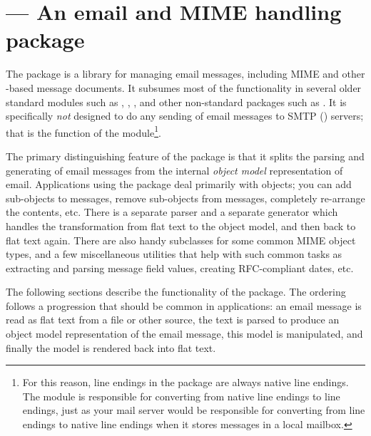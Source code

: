 
\section{ ---
	 An email and MIME handling package}



The  package is a library for managing email messages,
including MIME and other -based message documents.  It
subsumes most of the functionality in several older standard modules
such as , ,
, and other non-standard packages such as
.  It is specifically \emph{not} designed to do any
sending of email messages to SMTP () servers; that is the
function of the  module\footnote{For this reason,
line endings in the  package are always native line
endings.  The  module is responsible for converting
from native line endings to  line endings, just as your mail
server would be responsible for converting from  line
endings to native line endings when it stores messages in a local
mailbox.}.

The primary distinguishing feature of the  package is
that it splits the parsing and generating of email messages from the
internal \emph{object model} representation of email.  Applications
using the  package deal primarily with objects; you can
add sub-objects to messages, remove sub-objects from messages,
completely re-arrange the contents, etc.  There is a separate parser
and a separate generator which handles the transformation from flat
text to the object model, and then back to flat text again.  There
are also handy subclasses for some common MIME object types, and a few
miscellaneous utilities that help with such common tasks as extracting
and parsing message field values, creating RFC-compliant dates, etc.

The following sections describe the functionality of the
 package.  The ordering follows a progression that
should be common in applications: an email message is read as flat
text from a file or other source, the text is parsed to produce an
object model representation of the email message, this model is
manipulated, and finally the model is rendered back into
flat text.

